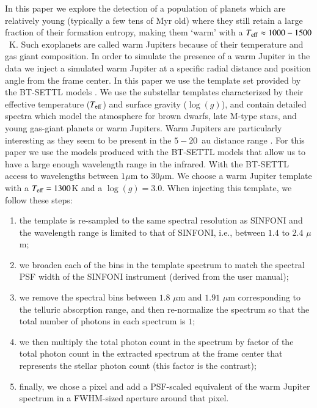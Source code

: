 \documentclass{aa}
\begin{document}
In this paper we explore the detection of a population of planets which are relatively young (typically a few tens of Myr old) where they still retain a large fraction of their formation entropy, making them `warm' with a $T_{\rm eff}\approx 1000 - 1500$~K.
Such exoplanets are called warm Jupiters because of their temperature and gas giant composition.
In order to simulate the presence of a warm Jupiter in the data we inject a simulated warm Jupiter at a specific radial distance and position angle from the frame center.
In this paper we use the template set provided by the BT-SETTL models \citep{1997Allard, 2011Allard}. 
We use the substellar templates characterized by their effective temperature ($T_{\rm{eff}}$) and surface gravity ($\log(g)$), and contain detailed spectra which model the atmosphere for brown dwarfs, late M-type stars, and young gas-giant planets or warm Jupiters.
Warm Jupiters are particularly interesting as they seem to be present in the $5-20$~au distance range \cite{2016Bryan}.
For this paper we use the models produced with the BT-SETTL models \citep[][]{2003BTsettl} that allow us to have a large enough wavelength range in the infrared. 
With the BT-SETTL access to wavelengths between $1\mu$m to $30\mu$m.
We choose a warm Jupiter template with a $T_{\rm eff} = 1300$K and a $\log(g)=3.0$.
When injecting this template, we follow these steps:
\begin{enumerate}
    \item the template is re-sampled to the same spectral resolution as SINFONI and the wavelength range is limited to that of SINFONI, i.e., between $1.4$ to $2.4$ $\mu$m;
    \item we broaden each of the bins in the template spectrum to match the spectral PSF width of the SINFONI instrument (derived from the user manual);
    \item we remove the spectral bins between $1.8$ $\mu$m and $1.91$ $\mu$m corresponding to the telluric absorption range, and then re-normalize the spectrum so that the total number of photons in each spectrum is $1$;
    \item we then multiply the total photon count in the spectrum by factor of the total photon count in the extracted spectrum at the frame center that represents the stellar photon count (this factor is the contrast);
    \item finally, we chose a pixel and add a PSF-scaled equivalent of the warm Jupiter spectrum in a FWHM-sized aperture around that pixel.
\end{enumerate}
\end{document}

